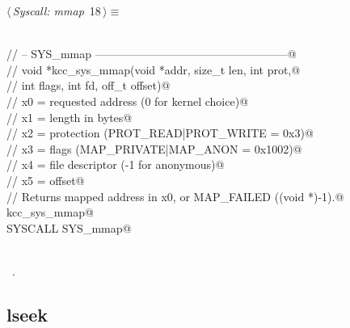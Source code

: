 \documentclass[11pt,a4paper,twoside,openright,DIV=15]{scrbook}
\theoremstyle{definition}
\theoremstyle{plain}
\theoremstyle{remark}
\begin{document}
\begin{flushleft} \small
\begin{minipage}{\linewidth}\label{scrap8}\raggedright\small
{} $\langle\,${\itshape Syscall: mmap}\nobreak\ {\footnotesize {18}}$\,\rangle\equiv$
\vspace{-1ex}
\begin{list}{}{} \item
\mbox{}\verb@@\\
\mbox{}\verb@// -- SYS_mmap ---------------------------------------------------@\\
\mbox{}\verb@// void *kcc_sys_mmap(void *addr, size_t len, int prot,@\\
\mbox{}\verb@//                    int flags, int fd, off_t offset)@\\
\mbox{}\verb@//   x0 = requested address (0 for kernel choice)@\\
\mbox{}\verb@//   x1 = length in bytes@\\
\mbox{}\verb@//   x2 = protection (PROT_READ|PROT_WRITE = 0x3)@\\
\mbox{}\verb@//   x3 = flags (MAP_PRIVATE|MAP_ANON = 0x1002)@\\
\mbox{}\verb@//   x4 = file descriptor (-1 for anonymous)@\\
\mbox{}\verb@//   x5 = offset@\\
\mbox{}\verb@// Returns mapped address in x0, or MAP_FAILED ((void *)-1).@\\
\mbox{}\verb@FUNC kcc_sys_mmap@\\
\mbox{}\verb@    SYSCALL SYS_mmap@\\
\mbox{}\verb@ENDFUNC@\\
\mbox{}\verb@@{\NWsep}
\end{list}
\vspace{-1.5ex}
\footnotesize
\begin{list}{}{\setlength{\itemsep}{-\parsep}\setlength{\itemindent}{-\leftmargin}}
\item \NWtxtMacroRefIn\ .

\item{}
\end{list}
\end{minipage}\vspace{4ex}
\end{flushleft}
\subsection{lseek}
\end{document}
